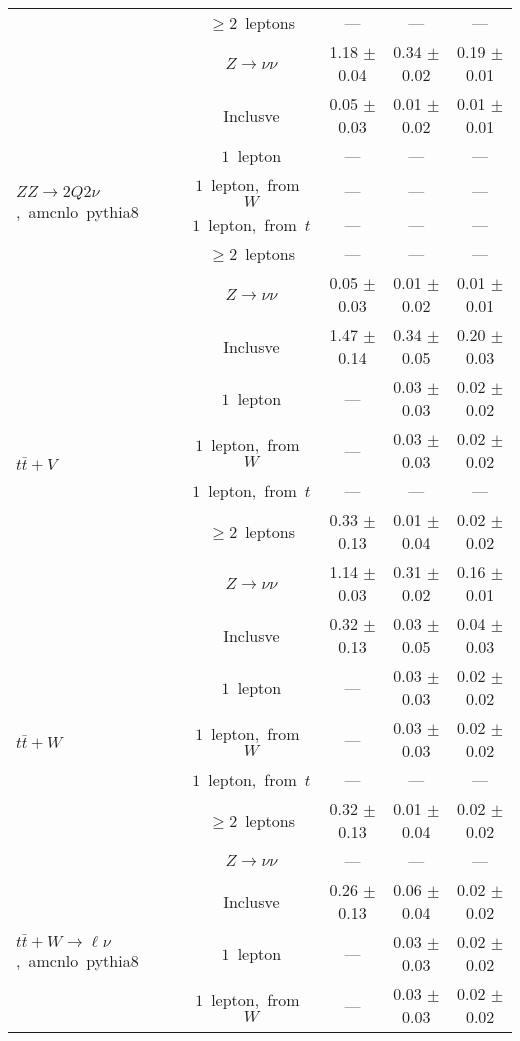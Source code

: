 \documentclass{article}
\begin{document}
\begin{longtable}{|l|c|c|c|c|}
 & $\ge2$~leptons  & ---  & ---  & --- \\* 
 & $Z\rightarrow\nu\nu$  & 1.18 $\pm$ 0.04  & 0.34 $\pm$ 0.02  & 0.19 $\pm$ 0.01 \\* 
\hline 
\multirow{6}{*}{$ZZ{\rightarrow}2Q2{\nu}$,~amcnlo~pythia8} & Inclusve  & 0.05 $\pm$ 0.03  & 0.01 $\pm$ 0.02  & 0.01 $\pm$ 0.01 \\* 
 & $1$~lepton  & ---  & ---  & --- \\* 
 & $1$~lepton,~from~$W$  & ---  & ---  & --- \\* 
 & $1$~lepton,~from~$t$  & ---  & ---  & --- \\* 
 & $\ge2$~leptons  & ---  & ---  & --- \\* 
 & $Z\rightarrow\nu\nu$  & 0.05 $\pm$ 0.03  & 0.01 $\pm$ 0.02  & 0.01 $\pm$ 0.01 \\* 
\hline 
\multirow{6}{*}{$t\bar{t}+V$} & Inclusve  & 1.47 $\pm$ 0.14  & 0.34 $\pm$ 0.05  & 0.20 $\pm$ 0.03 \\* 
 & $1$~lepton  & ---  & 0.03 $\pm$ 0.03  & 0.02 $\pm$ 0.02 \\* 
 & $1$~lepton,~from~$W$  & ---  & 0.03 $\pm$ 0.03  & 0.02 $\pm$ 0.02 \\* 
 & $1$~lepton,~from~$t$  & ---  & ---  & --- \\* 
 & $\ge2$~leptons  & 0.33 $\pm$ 0.13  & 0.01 $\pm$ 0.04  & 0.02 $\pm$ 0.02 \\* 
 & $Z\rightarrow\nu\nu$  & 1.14 $\pm$ 0.03  & 0.31 $\pm$ 0.02  & 0.16 $\pm$ 0.01 \\* 
\hline 
\multirow{6}{*}{$t\bar{t}+W$} & Inclusve  & 0.32 $\pm$ 0.13  & 0.03 $\pm$ 0.05  & 0.04 $\pm$ 0.03 \\* 
 & $1$~lepton  & ---  & 0.03 $\pm$ 0.03  & 0.02 $\pm$ 0.02 \\* 
 & $1$~lepton,~from~$W$  & ---  & 0.03 $\pm$ 0.03  & 0.02 $\pm$ 0.02 \\* 
 & $1$~lepton,~from~$t$  & ---  & ---  & --- \\* 
 & $\ge2$~leptons  & 0.32 $\pm$ 0.13  & 0.01 $\pm$ 0.04  & 0.02 $\pm$ 0.02 \\* 
 & $Z\rightarrow\nu\nu$  & ---  & ---  & --- \\* 
\hline 
\multirow{6}{*}{$t\bar{t}+W{\rightarrow}{\ell}{\nu}$,~amcnlo~pythia8} & Inclusve  & 0.26 $\pm$ 0.13  & 0.06 $\pm$ 0.04  & 0.02 $\pm$ 0.02 \\* 
 & $1$~lepton  & ---  & 0.03 $\pm$ 0.03  & 0.02 $\pm$ 0.02 \\* 
 & $1$~lepton,~from~$W$  & ---  & 0.03 $\pm$ 0.03  & 0.02 $\pm$ 0.02 \\* 

\end{longtable}
\end{document}
